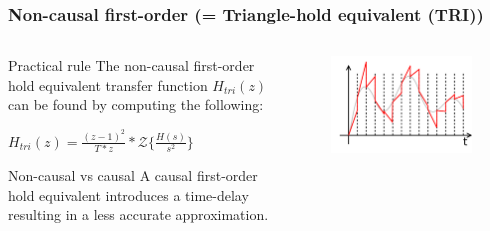 \begin{frame}
	\frametitle{Non-causal first-order (= Triangle-hold equivalent (TRI))}
\begin{columns}
	\begin{column}{0.5\textwidth}
	\begin{block}{Practical rule}
		The non-causal first-order hold equivalent transfer function $H_{tri}(z)$ can be found by computing the following:
		\begin{center}
			$H_{tri}(z) = \frac{(z-1)^{2}}{T*z} * \mathcal{Z}\{\frac{H(s)}{s^{2}}\}$
		\end{center}
	\end{block}
	
	\begin{alertblock}{Non-causal vs causal}
		A causal first-order hold equivalent introduces a time-delay resulting in a less accurate approximation.
	\end{alertblock}
	\end{column}
	
	\begin{column}{0.5\textwidth}
		\begin{figure}
			\centering
			\includegraphics[width=1\linewidth]{first-order}
		\end{figure}
	\end{column}
\end{columns}
\end{frame}

